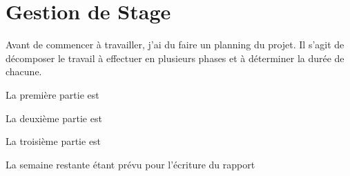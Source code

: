 \chapter{Gestion de Stage}

Avant de commencer à travailler, j'ai du faire un planning du projet. Il s'agit de décomposer le travail à
effectuer en plusieurs phases et à déterminer la durée de chacune.

La première partie est 

La deuxième partie est 

La troisième partie est

La semaine restante étant prévu pour l'écriture du rapport

